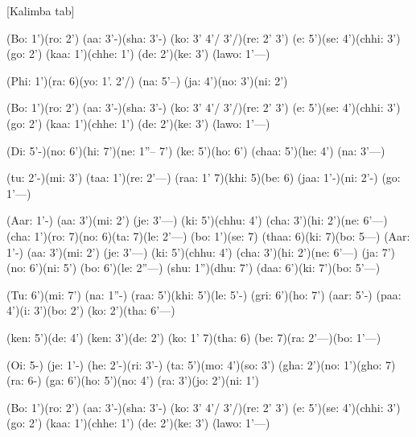 \documentclass[11pt]{article}
\begin{document}
[Kalimba tab]
\begin{jianpu}
(Bo: 1')(ro: 2') (aa: 3'-)(sha: 3'-) (ko: 3' 4'/ 3'/)(re: 2' 3') (e: 5')(se: 4')(chhi: 3') (go: 2')
(kaa: 1')(chhe: 1') (de: 2')(ke: 3') (lawo: 1'---)

(Phi: 1')(ra: 6)(yo: 1'. 2'/) (na: 5'--) (ja: 4')(no: 3')(ni: 2')

(Bo: 1')(ro: 2') (aa: 3'-)(sha: 3'-) (ko: 3' 4'/ 3'/)(re: 2' 3') (e: 5')(se: 4')(chhi: 3') (go: 2')
(kaa: 1')(chhe: 1') (de: 2')(ke: 3') (lawo: 1'---)

(Di: 5'-)(no: 6')(hi: 7')(ne: 1''-- 7') (ke: 5')(ho: 6') (chaa: 5')(he: 4') (na: 3'---)

(tu: 2'-)(mi: 3') (taa: 1')(re: 2'---) (raa: 1' 7)(khi: 5)(be: 6)
(jaa: 1'-)(ni: 2'-) (go: 1'---)

(Aar: 1'-) (aa: 3')(mi: 2') (je: 3'---) (ki: 5')(chhu: 4') (cha: 3')(hi: 2')(ne: 6'---)
(cha: 1')(ro: 7)(no: 6)(ta: 7)(le: 2'---) (bo: 1')(se: 7) (thaa: 6)(ki: 7)(bo: 5---)
(Aar: 1'-) (aa: 3')(mi: 2') (je: 3'---) (ki: 5')(chhu: 4') (cha: 3')(hi: 2')(ne: 6'---)
(ja: 7')(no: 6')(ni: 5') (bo: 6')(le: 2''---) (shu: 1'')(dhu: 7') (daa: 6')(ki: 7')(bo: 5'---)

(Tu: 6')(mi: 7') (na: 1''-) (raa: 5')(khi: 5')(le: 5'-)
(gri: 6')(ho: 7') (aar: 5'-) (paa: 4')(i: 3')(bo: 2') (ko: 2')(tha: 6'---)

(ken: 5')(de: 4') (ken: 3')(de: 2') (ko: 1' 7)(tha: 6) (be: 7)(ra: 2'---)(bo: 1'---)

(Oi: 5-) (je: 1'-) (he: 2'-)(ri: 3'-)
(ta: 5')(mo: 4')(so: 3') (gha: 2')(no: 1')(gho: 7)(ra: 6-) (ga: 6')(ho: 5')(no: 4') (ra: 3')(jo: 2')(ni: 1')

(Bo: 1')(ro: 2') (aa: 3'-)(sha: 3'-) (ko: 3' 4'/ 3'/)(re: 2' 3') (e: 5')(se: 4')(chhi: 3') (go: 2')
(kaa: 1')(chhe: 1') (de: 2')(ke: 3') (lawo: 1'---)
\end{jianpu}
\end{document}
